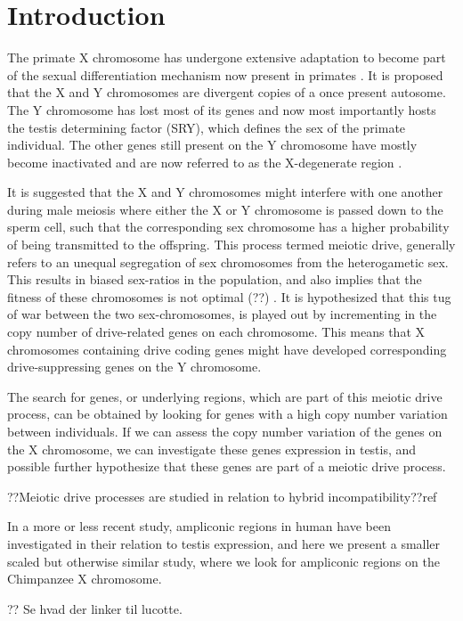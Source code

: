 \section*{Introduction}






The primate X chromosome has undergone extensive adaptation to become part of the sexual differentiation mechanism now present in primates \cite{skaletsklyMSY}.  It is proposed that the X and Y chromosomes are divergent copies of a once present autosome. The Y chromosome has lost most of its genes and now most importantly hosts the testis determining factor (SRY), which defines the sex of the primate individual. The other genes still present on the Y chromosome have mostly become inactivated and are now referred to as the X-degenerate region \cite{skaletsklyMSY}.


It is suggested that the X and Y chromosomes might interfere with one another during male meiosis where either the X or Y chromosome is passed down to the sperm cell, such that the corresponding sex chromosome has a higher probability of being transmitted to the offspring. This process termed meiotic drive, generally refers to an unequal segregation of sex chromosomes from the heterogametic sex. This results in biased sex-ratios in the population, and also implies that the fitness of these chromosomes is not optimal (??) \cite{doi:jaenike_10.1146/annurev.ecolsys.32.081501.113958}. It is hypothesized that this tug of war between the two sex-chromosomes, is played out by incrementing in the copy number of drive-related genes on each chromosome. This means that X chromosomes containing drive coding genes might have developed corresponding drive-suppressing genes on the Y chromosome. 

The search for genes, or underlying regions, which are part of this meiotic drive process, can be obtained by looking for genes with a high copy number variation between individuals. If we can assess the copy number variation of the genes on the X chromosome, we can investigate these genes expression in testis, and possible further hypothesize that these genes are part of a meiotic drive process.

??Meiotic drive processes are studied in relation to hybrid incompatibility??ref


In a more or less recent study\cite{Lucotte907}, ampliconic regions in human have been investigated in their relation to testis expression, and here we present a smaller scaled but otherwise similar study, where we look for ampliconic regions on the Chimpanzee X chromosome.



?? Se hvad der linker til lucotte.